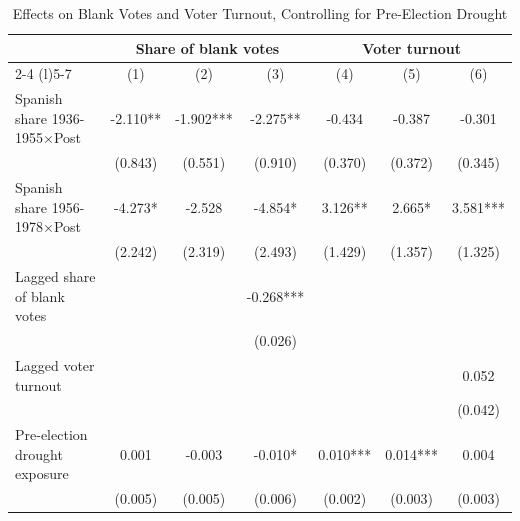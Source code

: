 \begin{table}[!h]
\caption{Effects on Blank Votes and Voter Turnout, Controlling for Pre-Election Drought}
\renewcommand{\arraystretch}{1.25}
\setlength{\tabcolsep}{6pt}
\centering
\begin{tabular}[t]{lcccccc}
\hline
 & \multicolumn{3}{c}{Share of blank votes} & \multicolumn{3}{c}{Voter turnout} \\
\cmidrule(l){2-4} \cmidrule(l){5-7}
  & (1) & (2) & (3) & (4) & (5) & (6)\\
\hline
Spanish share 1936-1955$\times$Post & -2.110** & -1.902*** & -2.275** & -0.434 & -0.387 & -0.301\\
 & (0.843) & (0.551) & (0.910) & (0.370) & (0.372) & (0.345)\\
Spanish share 1956-1978$\times$Post & -4.273* & -2.528 & -4.854* & 3.126** & 2.665* & 3.581***\\
 & (2.242) & (2.319) & (2.493) & (1.429) & (1.357) & (1.325)\\
Lagged share of blank votes &  &  & -0.268*** &  &  & \\
 &  &  & (0.026) &  &  & \\
Lagged voter turnout &  &  &  &  &  & 0.052\\
 &  &  &  &  &  & (0.042)\\
Pre-election drought exposure & 0.001 & -0.003 & -0.010* & 0.010*** & 0.014*** & 0.004\\
 & (0.005) & (0.005) & (0.006) & (0.002) & (0.003) & (0.003)\\


\end{tabular}
\end{table}
